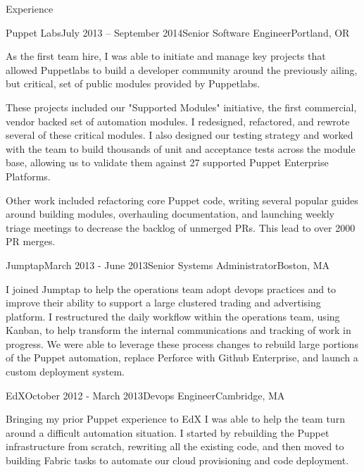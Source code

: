\documentclass{resume} %
\begin{document}
\begin{rSection}{Experience}
\begin{rSubsection}{Puppet Labs}{July 2013 -- September 2014}{Senior Software Engineer}{Portland, OR}
\item[] As the first team hire, I was able to initiate and manage key projects that allowed Puppetlabs to build a developer community around the previously ailing, but critical, set of public modules provided by Puppetlabs.

These projects included our "Supported Modules" initiative, the first commercial, vendor backed set of  automation modules.  I redesigned, refactored, and rewrote several of these critical modules.  I also designed our testing strategy and worked with the team to build thousands of unit and acceptance tests across the module base, allowing us to validate them against 27 supported Puppet Enterprise Platforms.

Other work included refactoring core Puppet code, writing several popular guides around building modules, overhauling documentation, and launching weekly triage meetings to decrease the backlog of unmerged PRs.  This lead to over 2000 PR merges.
\end{rSubsection}


\begin{rSubsection}{Jumptap}{March 2013 - June 2013}{Senior Systems Administrator}{Boston, MA}
\item[] I joined Jumptap to help the operations team adopt devops practices and to improve their ability to support a large clustered trading and advertising platform.  I restructured the daily workflow within the operations team, using Kanban, to help transform the internal communications and tracking of work in progress.  We were able to leverage these process changes to rebuild large portions of the Puppet automation, replace Perforce with Github Enterprise, and launch a custom deployment system.

\end{rSubsection}


\begin{rSubsection}{EdX}{October 2012 - March 2013}{Devops Engineer}{Cambridge, MA}
\item[] Bringing my prior Puppet experience to EdX I was able to help the team turn around a difficult automation situation.  I started by rebuilding the Puppet infrastructure from scratch, rewriting all the existing code, and then moved to building Fabric tasks to automate our cloud provisioning and code deployment.


\end{rSubsection}
\end{rSection}
\end{document}
